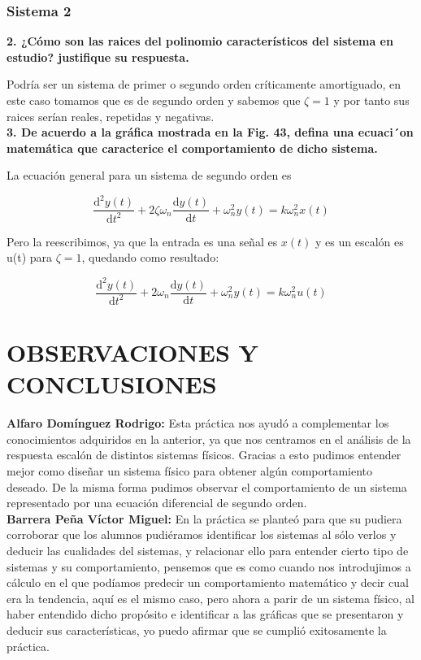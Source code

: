 \subsubsection{Sistema 2}

\textbf{2. ¿Cómo son las raices del polinomio característicos del sistema en estudio? justifique su respuesta.}

Podría ser un sistema de primer o segundo orden críticamente amortiguado, en este caso tomamos que es de segundo orden y sabemos que   $\zeta= 1$ y por tanto sus raices serían reales, repetidas y negativas.\\


\textbf{3. De acuerdo a la gráfica mostrada en la Fig. 43, defina una ecuaci´on matemática que caracterice el comportamiento de dicho sistema.}

La ecuación general para un sistema de segundo orden es

$$
\frac{\mathrm{d}^{2} y(t)}{\mathrm{d} t^{2}}+2 \zeta \omega_{n} \frac{\mathrm{d} y(t)}{\mathrm{d} t}+\omega_{n}^{2} y(t)=k \omega_{n}^{2} x(t)
$$

Pero la reescribimos, ya que la entrada es una señal es $x(t)$ y es un escalón es u(t) para $\zeta=1$, quedando como resultado:

$$
\frac{\mathrm{d}^{2} y(t)}{\mathrm{d} t^{2}}+2 \omega_{n} \frac{\mathrm{d} y(t)}{\mathrm{d} t}+\omega_{n}^{2} y(t)=k \omega_{n}^{2} u(t)
$$

\section{OBSERVACIONES Y CONCLUSIONES}


\textbf{Alfaro Domínguez Rodrigo:} Esta práctica nos ayudó a complementar los conocimientos adquiridos en la anterior, ya que nos centramos en el análisis de la respuesta escalón de distintos sistemas físicos. Gracias a esto pudimos entender mejor como diseñar un sistema físico para obtener algún comportamiento deseado. De la misma forma pudimos observar el comportamiento de un sistema representado por una ecuación diferencial de segundo orden.\\

\textbf{ Barrera Peña Víctor Miguel:} En la práctica se planteó para que su pudiera corroborar que los alumnos pudiéramos identificar los sistemas al sólo verlos y deducir las cualidades del sistemas, y relacionar ello para entender cierto tipo de sistemas y su comportamiento, pensemos que es como cuando nos introdujimos a cálculo en el que podíamos predecir un comportamiento matemático y decir cual era la tendencia, aquí es el mismo caso, pero ahora a parir de un sistema físico, al haber entendido dicho propósito e identificar a las gráficas que se presentaron y deducir sus características, yo puedo afirmar que se cumplió exitosamente la práctica.\\


